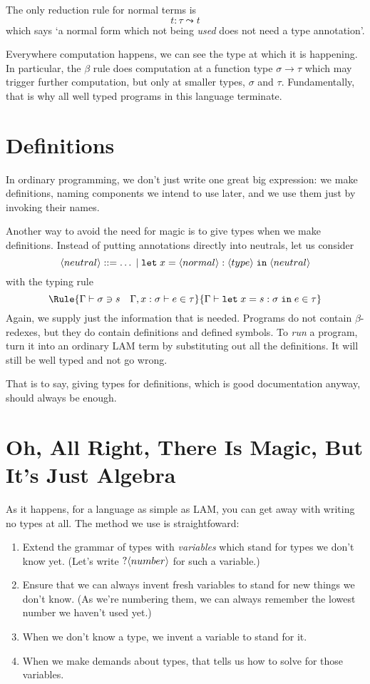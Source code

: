 \documentclass{article}
\begin{document}
The only reduction rule for normal terms is
\[
  t : \tau \leadsto t
\]
which says `a normal form which not being \emph{used} does not need a
type annotation'.

Everywhere computation happens, we can see the type at which it is happening.
In particular, the $\beta$ rule does computation at a function type
$\sigma\to\tau$ which may trigger further computation, but only at
smaller types, $\sigma$ and $\tau$. Fundamentally, that is why all well
typed programs in this language terminate.


\section{Definitions}

In ordinary programming, we don't just write one great big expression: we
make definitions, naming components we intend to use later, and we use them
just by invoking their names.

Another way to avoid the need for magic is to give types when we make
definitions. Instead of putting annotations directly into neutrals, let us
consider
\[
  \langle neutral \rangle ::= \ldots \;|\; \mathtt{let}\;x=\langle normal \rangle:\langle type \rangle\;\mathtt{in}\; \langle neutral \rangle
\]
with the typing rule
\[\Rule{\Gamma\vdash \sigma\ni s\quad \Gamma,x:\sigma\vdash e\in\tau}
       {\Gamma\vdash \mathtt{let}\;x=s:\sigma\;\mathtt{in}\;e\in\tau}
\]
Again, we supply just the information that is needed. Programs do not
contain $\beta$-redexes, but they do contain definitions and defined
symbols. To \emph{run} a program, turn it into an ordinary LAM
term by substituting out all the definitions. It will still be well
typed and not go wrong.

That is to say, giving types for definitions, which is good documentation
anyway, should always be enough.


\section{Oh, All Right, There Is Magic, But It's Just Algebra}

As it happens, for a language as simple as LAM, you can get away with
writing no types at all. The method we use is straightfoward:
\begin{enumerate}
\item Extend the grammar of types with \emph{variables} which stand
  for types we don't know yet. (Let's write $?\langle number \rangle$ for such
  a variable.)
\item Ensure that we can always invent fresh variables to stand for
  new things we don't know. (As we're numbering them, we can always
  remember the lowest number we haven't used yet.)
\item When we don't know a type, we invent a variable to stand for it.
\item When we make demands about types, that tells us how to solve
  for those variables.
\end{enumerate}
\end{document}
